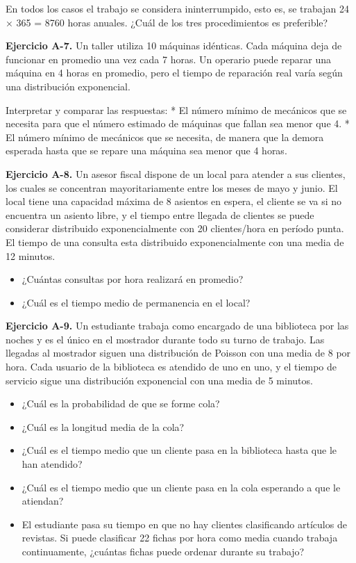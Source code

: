 \documentclass[
]{book}
\providecommand{\tightlist}{%
  \setlength{\itemsep}{0pt}\setlength{\parskip}{0pt}}
\theoremstyle{definition}
\theoremstyle{definition}
\theoremstyle{definition}
\theoremstyle{definition}
\theoremstyle{remark}
\begin{document}
En todos los casos el trabajo se considera ininterrumpido, esto es, se trabajan 24 × 365 = 8760 horas anuales. ¿Cuál de los tres procedimientos es preferible?

\textbf{Ejercicio A-7.} Un taller utiliza 10 máquinas idénticas. Cada máquina deja de funcionar en promedio una vez cada 7 horas. Un operario puede reparar una máquina en 4 horas en promedio, pero el tiempo de reparación real varía según una distribución exponencial.

Interpretar y comparar las respuestas:
* El número mínimo de mecánicos que se necesita para que el número estimado de máquinas que fallan sea menor que 4.
* El número mínimo de mecánicos que se necesita, de manera que la demora esperada hasta que se repare una máquina sea menor que 4 horas.

\textbf{Ejercicio A-8.} Un asesor fiscal dispone de un local para atender a sus clientes, los cuales se
concentran mayoritariamente entre los meses de mayo y junio. El local tiene una capacidad máxima de 8 asientos en espera, el cliente se va si no encuentra un asiento libre, y el tiempo entre llegada de clientes se puede considerar distribuido exponencialmente con 20 clientes/hora en período punta. El tiempo de una consulta esta distribuido exponencialmente con una media de 12 minutos.

\begin{itemize}
\tightlist
\item
  ¿Cuántas consultas por hora realizará en promedio?
\item
  ¿Cuál es el tiempo medio de permanencia en el local?
\end{itemize}

\textbf{Ejercicio A-9.} Un estudiante trabaja como encargado de una biblioteca por las noches y es el único en el mostrador durante todo su turno de trabajo. Las llegadas al mostrador siguen una distribución de Poisson con una media de 8 por hora. Cada usuario de la biblioteca es atendido de uno en uno, y el tiempo de servicio sigue una distribución exponencial con una media de 5 minutos.

\begin{itemize}
\tightlist
\item
  ¿Cuál es la probabilidad de que se forme cola?
\item
  ¿Cuál es la longitud media de la cola?
\item
  ¿Cuál es el tiempo medio que un cliente pasa en la biblioteca hasta que le han atendido?
\item
  ¿Cuál es el tiempo medio que un cliente pasa en la cola esperando a que le atiendan?
\item
  El estudiante pasa su tiempo en que no hay clientes clasificando artículos de revistas. Si puede clasificar 22 fichas por hora como media cuando trabaja continuamente, ¿cuántas fichas puede ordenar durante su trabajo?
\end{itemize}
\end{document}
